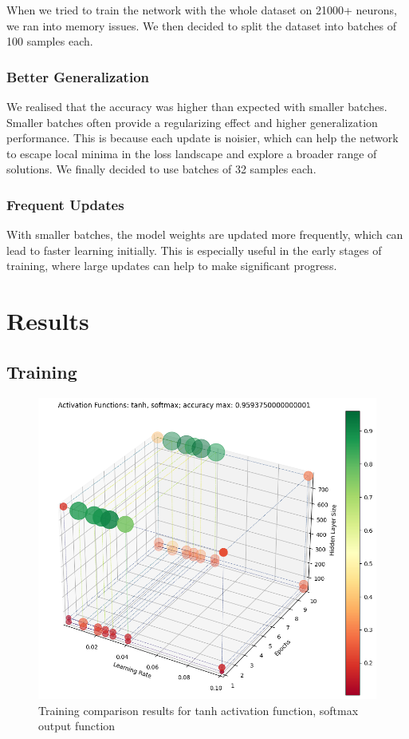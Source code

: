 \documentclass[utf8,1pt]{extarticle} %
\begin{document}
When we tried to train the network with the 
whole dataset on 21000+ neurons, 
we ran into memory issues.
We then decided to split the dataset into batches of 100 samples each.

\subsubsection{Better Generalization} 
We realised that the accuracy was higher than expected with smaller batches.
Smaller batches often provide a regularizing effect
 and higher generalization performance. 
 This is because each update is noisier, 
 which can help the network to escape 
 local minima in the loss landscape and 
 explore a broader range of solutions.
We finally decided to use batches of 32 samples each.

\subsubsection{Frequent Updates} 
With smaller batches, 
the model weights are updated more frequently, 
which can lead to faster learning initially. 
This is especially useful in the early stages of training, 
where large updates can help to make significant progress.


\section{Results}
\subsection{Training}
\begin{figure}
    \centering
    \includegraphics[width=\textwidth]{media/training/results_plot_activation_functions_tanh_softmax_2023-12-29162932.png}
    \caption{Training comparison results for tanh activation function, softmax output function}
    \label{fig:comparison}
\end{figure}
\end{document}
